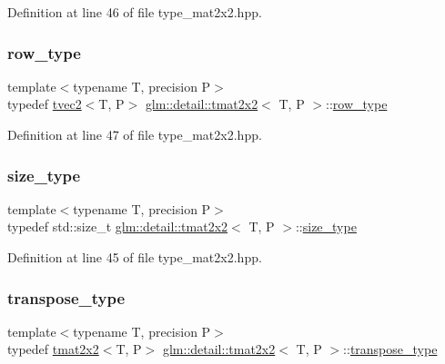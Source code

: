 Definition at line 46 of file type\+\_\+mat2x2.\+hpp.

\mbox{\label{structglm_1_1detail_1_1tmat2x2_a4c5c3a87c9c7ff8e725e928e71c7a260}} 
\subsubsection{\texorpdfstring{row\+\_\+type}{row\_type}}
{\footnotesize\ttfamily template$<$typename T, precision P$>$ \\
typedef \hyperlink{structglm_1_1detail_1_1tvec2}{tvec2}$<$T, P$>$ \hyperlink{structglm_1_1detail_1_1tmat2x2}{glm\+::detail\+::tmat2x2}$<$ T, P $>$\+::\hyperlink{structglm_1_1detail_1_1tmat2x2_a4c5c3a87c9c7ff8e725e928e71c7a260}{row\+\_\+type}}



Definition at line 47 of file type\+\_\+mat2x2.\+hpp.

\mbox{\label{structglm_1_1detail_1_1tmat2x2_abd8446f60873d982f61a108727193848}} 
\subsubsection{\texorpdfstring{size\+\_\+type}{size\_type}}
{\footnotesize\ttfamily template$<$typename T, precision P$>$ \\
typedef std\+::size\+\_\+t \hyperlink{structglm_1_1detail_1_1tmat2x2}{glm\+::detail\+::tmat2x2}$<$ T, P $>$\+::\hyperlink{structglm_1_1detail_1_1tmat2x2_abd8446f60873d982f61a108727193848}{size\+\_\+type}}



Definition at line 45 of file type\+\_\+mat2x2.\+hpp.

\mbox{\label{structglm_1_1detail_1_1tmat2x2_a91b971bd280c2387d22346261851033a}} 
\subsubsection{\texorpdfstring{transpose\+\_\+type}{transpose\_type}}
{\footnotesize\ttfamily template$<$typename T, precision P$>$ \\
typedef \hyperlink{structglm_1_1detail_1_1tmat2x2}{tmat2x2}$<$T, P$>$ \hyperlink{structglm_1_1detail_1_1tmat2x2}{glm\+::detail\+::tmat2x2}$<$ T, P $>$\+::\hyperlink{structglm_1_1detail_1_1tmat2x2_a91b971bd280c2387d22346261851033a}{transpose\+\_\+type}}



